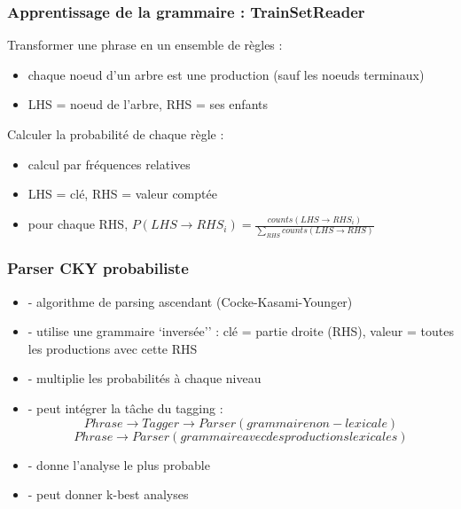 \documentclass{beamer}
\begin{document}
\begin{frame}
\frametitle{Apprentissage de la grammaire : TrainSetReader}
Transformer une phrase en un ensemble de r\`egles : 
\begin{itemize}
  \item chaque noeud d'un arbre est une production (sauf les noeuds terminaux)
  \item LHS = noeud de l'arbre, RHS = ses enfants
\end{itemize}
\pause
Calculer la probabilit\'e de chaque r\`egle : 
\begin{itemize}
  \item calcul par fr\'equences relatives
  \item LHS = cl\'e, RHS = valeur compt\'ee
  \item pour chaque RHS, $P(LHS \rightarrow RHS_{i}) = \frac{counts(LHS
  \rightarrow RHS_{i})}{\sum_{RHS}counts(LHS \rightarrow RHS)}$
\end{itemize}
\end{frame}

\begin{frame}
\frametitle{Parser CKY probabiliste}
\begin{itemize}
  \item - algorithme de parsing ascendant (Cocke-Kasami-Younger)
  \item - utilise une grammaire `invers\'ee'' : cl\'e = partie droite
  (RHS), valeur = toutes les productions avec cette RHS
  \item - multiplie les probabilit\'es \`a chaque niveau
  \item - peut int\'egrer la t\^ache du tagging : $$Phrase \rightarrow Tagger \rightarrow Parser (grammaire non-lexicale)$$ $$Phrase \rightarrow Parser (grammaire avec des productions lexicales)$$
  \item - donne l'analyse le plus probable
  \item - peut donner k-best analyses
\end{itemize}
\end{frame}
\end{document}
